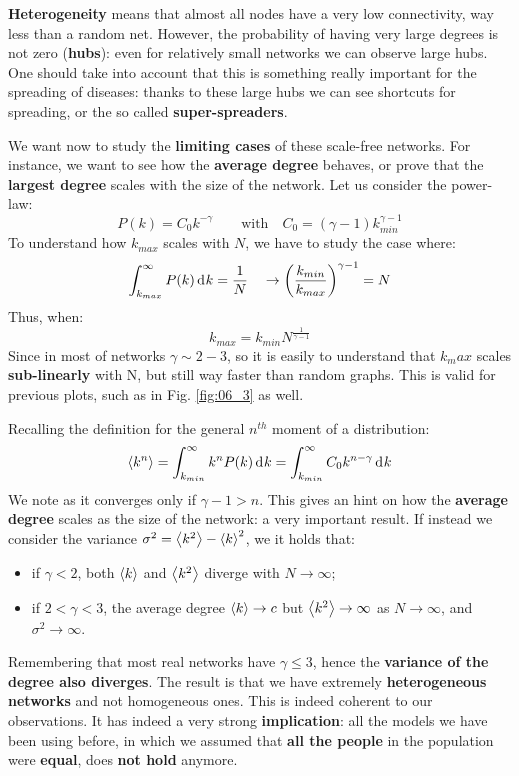 \documentclass[../main/main.tex]{subfiles}
\begin{document}
\textbf{Heterogeneity} means that almost all nodes have a very low connectivity, way less than a random net. However, the probability of having very large degrees is not zero (\textbf{hubs}): even for relatively small networks we can observe large hubs. One should take into account that this is something really important for the spreading of diseases: thanks to these large hubs we can see shortcuts for spreading, or the so called \textbf{super-spreaders}.

We want now to study the \textbf{limiting cases} of these scale-free networks. For instance, we want to see how the \textbf{average degree} behaves, or prove that the \textbf{largest degree} scales with the size of the network. Let us consider the power-law:
\begin{equation}
  P(k) = C_0 k^{-\gamma } \qquad \text{with} \quad C_0 = (\gamma -1  ) k_{min}^{\gamma -1 }
\end{equation}
To understand how \( k_{max} \) scales with \( N \), we have to study the case where:
\begin{equation*}
  \int_{k_{max}}^{\infty } P(k) \dd[]{k}  = \frac{1}{N} \quad \rightarrow  \qty(\frac{k_{min}}{k_{max}})^{\gamma -1 } = N
\end{equation*}
Thus, when:
\begin{equation}
  k_{max} = k_{min} N^{\frac{1}{\gamma -1 }}
\end{equation}
Since in most of networks \( \gamma \sim 2-3  \), so it is easily to understand that $k_max$ scales \textbf{sub-linearly} with N, but still way faster than random graphs. This is valid for previous plots, such as in Fig. \ref{fig:06_3} as well.

Recalling the definition for the general \( n^{th} \) moment of a distribution: 
\begin{equation}
  \expval{k^n} = \int_{k_{min}}^{\infty } k^n P(k) \dd[]{k} = \int_{k_{min}}^{\infty }  C_0 k^{n- \gamma  }\dd[]{k}
\end{equation}
We note as it converges only if \( \gamma -1 > n  \). This gives an hint on how the \textbf{average degree} scales as the size of the network: a very important result. If instead we consider the variance \( \sigma ^2  = \expval{k^2} - \expval{k}^2  \), we it holds that:
\begin{itemize}
\item if \( \gamma <2  \), both \( \expval{k}  \) and \( \expval{k^2}  \) diverge with \( N \rightarrow  \infty  \);

\item if \( 2 < \gamma < 3  \), the average degree \( \expval{k}  \rightarrow c \) but \( \expval{k^2}  \rightarrow \infty \) as \( N \rightarrow  \infty  \), and \( \sigma ^2 \rightarrow \infty  \).
\end{itemize}
Remembering that most real networks have \( \gamma \le 3 \), hence the \textbf{variance of the degree also diverges}. The result is that we have extremely \textbf{heterogeneous networks} and not homogeneous ones. This is indeed coherent to our observations. 
It has indeed a very strong \textbf{implication}: all the models we have been using before, in which we assumed that \textbf{all the people} in the population were \textbf{equal}, does \textbf{not hold} anymore.
\end{document}
